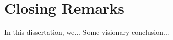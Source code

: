 \section{Closing Remarks}
\label{sec:conclusion:remarks}

In this dissertation, we... Some visionary conclusion...
